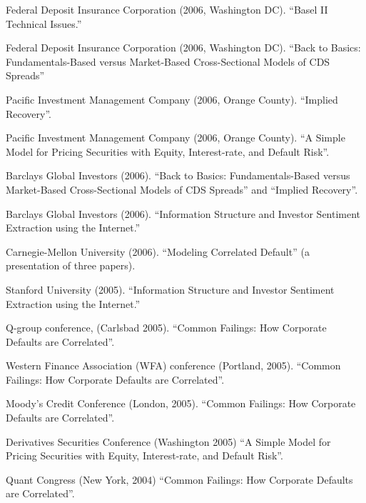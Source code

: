 \documentclass{article}
\begin{document}
\begin{etaremune}
{\item Federal Deposit Insurance Corporation (2006, Washington DC).
``Basel II Technical Issues.''

\item Federal Deposit Insurance Corporation (2006, Washington DC).
``Back to Basics: Fundamentals-Based versus Market-Based Cross-Sectional Models of CDS Spreads''

\item Pacific Investment Management Company (2006, Orange County). 
``Implied Recovery''.

\item Pacific Investment Management Company (2006, Orange County). 
``A Simple Model for Pricing  Securities with
Equity, Interest-rate, and Default Risk''.


\item Barclays Global Investors (2006). 
``Back to Basics: Fundamentals-Based versus Market-Based Cross-Sectional Models of CDS Spreads'' and ``Implied Recovery''. 

\item Barclays Global Investors (2006). 
``Information Structure and Investor Sentiment Extraction using the Internet.''

\item Carnegie-Mellon University (2006). 
``Modeling Correlated Default'' (a presentation of three papers). 

\item Stanford University (2005). 
``Information Structure and Investor Sentiment Extraction using the Internet.''

\item Q-group conference, (Carlsbad 2005). 
``Common Failings: How Corporate Defaults are Correlated''. 


\item Western Finance Association (WFA) conference (Portland, 2005). 
``Common Failings: How Corporate Defaults are Correlated''. 

\item Moody's Credit Conference (London, 2005). 
``Common Failings: How Corporate Defaults are Correlated''. 


\item Derivatives Securities Conference (Washington 2005) 
``A Simple Model for Pricing  Securities with
Equity, Interest-rate, and Default Risk''.


\item Quant Congress (New York, 2004) 
  ``Common Failings: How Corporate Defaults are Correlated''.
  
}
\end{etaremune}
\end{document}
